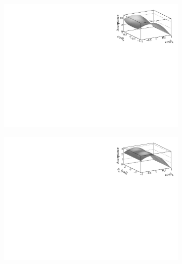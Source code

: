 \begin{figure}[t]
  \centering
  \begin{subfigure}{0.5\textwidth}
    \includegraphics[width=\textwidth]{Figures/Chapter4/canv_cosThK_cosThL_Sim08_3fb_hel_negKaons_all.pdf}
    \caption{}
    \label{eff2D_kl}
  \end{subfigure}%
  \hfill%
  \begin{subfigure}{0.5\textwidth}
    \includegraphics[width=\textwidth]{Figures/Chapter4/canv_cosThK_phi_Sim08_3fb_hel_negKaons_all.pdf}
    \caption{}
    \label{eff2D_kp}
  \end{subfigure}
  \begin{subfigure}{0.5\textwidth}

\end{subfigure}
\end{figure}
